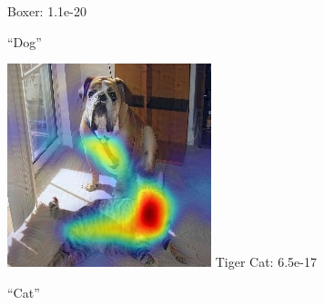 \begin{figure}[ht!]
\begin{center}
\begin{subfigure}[b]{0.32\linewidth}
        \tiny{Boxer: 1.1e-20}
		\caption{\tiny{\gcam{} ``Dog''}}
        \label{fig:gcam_dog_airliner}
    \end{subfigure}
    
    \begin{subfigure}[b]{0.32\linewidth}
    \vspace{10pt}
        \centering
        \includegraphics[width=1\linewidth]{figures/gcam_pos_vgg_405_4_cat_dog_283.jpg}
        \tiny{Tiger Cat: 6.5e-17\\}
		\caption{\tiny{\gcam{} ``Cat''}}
        \label{fig:gcam_cat_airliner}
	\end{subfigure}
    \begin{subfigure}[b]{0.33\linewidth}
    \vspace{10pt}
        \centering

\end{subfigure}
\end{center}
\end{figure}
